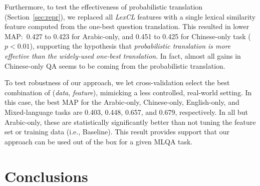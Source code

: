 \documentclass{sig-alternate-05-2015}
\begin{document}
Furthermore, to test the effectiveness of probabilistic translation (Section~\ref{sec:repr}), we replaced all 
{\em LexCL} features with a single lexical similarity feature computed from the one-best question translation. 
This resulted in lower MAP:\ 0.427 to 0.423 for Arabic-only, and 0.451 to 0.425 for Chinese-only task ($p < 0.01$), 
supporting the hypothesis that \emph{probabilistic translation is more effective than the widely-used 
one-best translation}. In fact, almost all gains in Chinese-only QA seems to be coming from the
probabilistic translation.

To test robustness of our approach, we let cross-validation select the best combination of 
(\emph{data}, \emph{feature}), mimicking a less controlled, real-world setting. In this case, the best 
MAP for the Arabic-only, Chinese-only, English-only, and Mixed-language tasks are 0.403, 0.448, 0.657, and 
0.679, respectively. In all but Arabic-only, these are statistically significantly better than 
not tuning the feature set or training data (i.e., Baseline). This result provides support that our approach
can be used out of the box for a given MLQA task.

\vspace{-0.15cm}
\section{Conclusions}\label{sec:concl}
%
%
\end{document}

